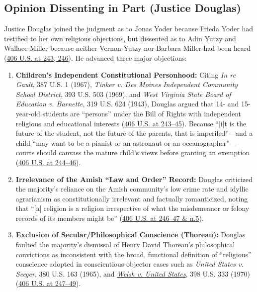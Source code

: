 \documentclass[12pt]{article}
\begin{document}
\subsection{Opinion Dissenting in Part (Justice Douglas)}

Justice Douglas joined the judgment as to Jonas Yoder because Frieda Yoder had testified to her own religious objections, but dissented as to Adin Yutzy and Wallace Miller because neither Vernon Yutzy nor Barbara Miller had been heard (\href{https://supreme.justia.com/cases/federal/us/406/205/}{406 U.S. at 243, 246}). He advanced three major objections:
\begin{enumerate}
  \item \textbf{Children's Independent Constitutional Personhood:} Citing \emph{In re Gault}, 387 U.S. 1 (1967), \emph{Tinker v. Des Moines Independent Community School District}, 393 U.S. 503 (1969), and \emph{West Virginia State Board of Education v. Barnette}, 319 U.S. 624 (1943), Douglas argued that 14- and 15-year-old students are ``persons'' under the Bill of Rights with independent religious and educational interests (\href{https://supreme.justia.com/cases/federal/us/406/205/}{406 U.S. at 243--45}). Because ``[i]t is the future of the student, not the future of the parents, that is imperiled''---and a child ``may want to be a pianist or an astronaut or an oceanographer''---courts should canvass the mature child's views before granting an exemption (\href{https://supreme.justia.com/cases/federal/us/406/205/}{406 U.S. at 244--46}).
  \item \textbf{Irrelevance of the Amish ``Law and Order'' Record:} Douglas criticized the majority's reliance on the Amish community's low crime rate and idyllic agrarianism as constitutionally irrelevant and factually romanticized, noting that ``[a] religion is a religion irrespective of what the misdemeanor or felony records of its members might be'' (\href{https://supreme.justia.com/cases/federal/us/406/205/}{406 U.S. at 246--47 \& n.5}).
  \item \textbf{Exclusion of Secular/Philosophical Conscience (Thoreau):} Douglas faulted the majority's dismissal of Henry David Thoreau's philosophical convictions as inconsistent with the broad, functional definition of ``religious'' conscience adopted in conscientious-objector cases such as \emph{United States v. Seeger}, 380 U.S. 163 (1965), and \href{https://supreme.justia.com/cases/federal/us/398/333/}{\emph{Welsh v. United States}}, 398 U.S. 333 (1970) (\href{https://supreme.justia.com/cases/federal/us/406/205/}{406 U.S. at 247--49}).
\end{enumerate}
\end{document}
